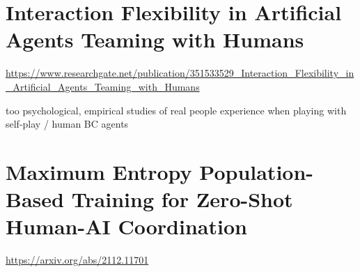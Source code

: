 \documentclass{report}
\begin{document}
\section{Interaction Flexibility in Artificial Agents Teaming with Humans}
\url{https://www.researchgate.net/publication/351533529_Interaction_Flexibility_in_Artificial_Agents_Teaming_with_Humans}
\begin{list}{}{}
    \item too psychological, empirical studies of real people experience when playing with self-play / human BC agents
\end{list}

\section{Maximum Entropy Population-Based Training for Zero-Shot Human-AI Coordination}
\url{https://arxiv.org/abs/2112.11701}
\end{document}
